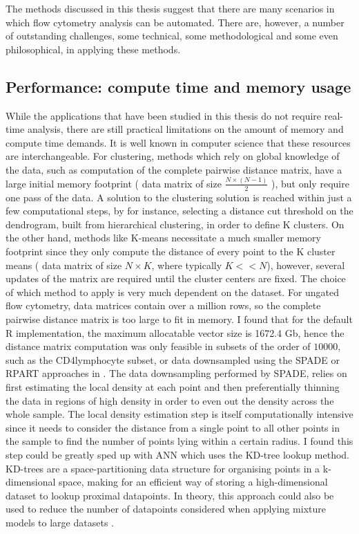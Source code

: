 The methods discussed in this thesis suggest that there are many scenarios in which flow cytometry analysis can be automated.
There are, however, a number of outstanding challenges, some technical, some methodological and some even philosophical, in applying these methods.


\subsection{Performance: compute time and memory usage}
While the applications that have been studied in this thesis do not require real-time analysis, there are still practical limitations on the amount of memory and compute time demands.
It is well known in computer science that these resources are interchangeable.
For clustering, methods which rely on global knowledge of the data, such as computation of the complete pairwise distance matrix, have a large initial memory footprint ( data matrix of size $\frac{N \times (N-1)}{2}$ ), but only require one pass of the data.
A solution to the clustering solution is reached within just a few computational steps, by for instance,
selecting a distance cut threshold on the dendrogram, built from hierarchical clustering, in order to define K clusters. 
On the other hand, methods like K-means necessitate a much smaller memory footprint since they only compute the distance of every point to the K cluster means ( data matrix of size $N \times K$, where typically $K << N$), however, several updates of the matrix are required until the cluster centers are fixed.
The choice of which method to apply is very much dependent on the dataset.
For ungated flow cytometry, data matrices  contain over a million rows, so the complete pairwise distance matrix is too large to fit in memory.
I found that for the default R implementation, the maximum allocatable vector size is 1672.4 Gb, hence the distance matrix computation was only feasible in subsets of the order of $10000$, such as the CD4\positive lymphocyte subset, or data downsampled using the SPADE or RPART approaches in .
The data downsampling performed by SPADE, relies on first estimating the local density at each point and then preferentially thinning the data in regions of high density in order to even out the density across the whole sample.
The local density estimation step is itself computationally intensive since it needs to consider the distance from a single point to all other points in the sample to find the number of points lying within a certain radius.
I found this step could be greatly sped up with \acrfull{ANN} which uses the \gls{KD-tree} lookup method.
\glspl{KD-tree} are a space-partitioning data structure for organising points in a k-dimensional space, making for an efficient way of storing a high-dimensional dataset to lookup proximal datapoints.
In theory, this approach could also be used to reduce the number of datapoints considered when applying mixture models to large datasets \citep{McLachlan:2004uw}.

